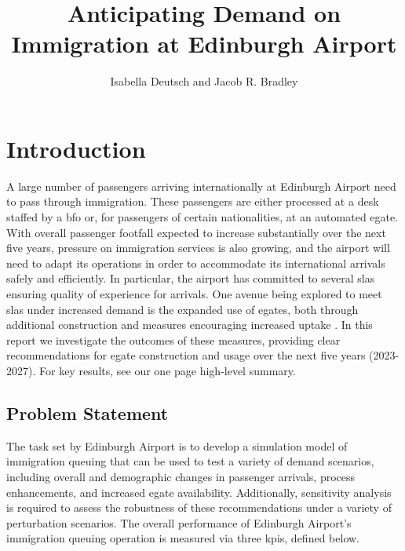 \documentclass[10pt]{article}
\title{Anticipating Demand on Immigration at Edinburgh Airport}
\author{Isabella Deutsch and Jacob R. Bradley}
\date{}
\begin{document}
\maketitle

\section{Introduction}

A large number of passengers arriving internationally at Edinburgh Airport need to pass through immigration. These passengers are either processed at a desk staffed by a \gls{bfo} or, for passengers of certain nationalities, at an automated \gls{egate}. With overall passenger footfall expected to increase substantially over the next five years, pressure on immigration services is also growing, and the airport will need to adapt its operations in order to accommodate its international arrivals safely and efficiently. In particular, the airport has committed to several \glspl{sla} ensuring quality of experience for arrivals.  One avenue being explored to meet \glspl{sla} under increased demand is the expanded use of \glspl{egate}, both through additional construction and measures encouraging increased uptake \cite{UK_border_2025}. In this report we investigate the outcomes of these measures, providing clear recommendations for \gls{egate} construction and usage over the next five years (2023-2027). For key results, see our one page high-level summary.

\subsection{Problem Statement}
The task set by Edinburgh Airport is to develop a simulation model of immigration queuing that can be used to test a variety of demand scenarios, including overall and demographic changes in passenger arrivals, process enhancements, and increased \gls{egate} availability. 
Additionally, sensitivity analysis is required to assess the robustness of these recommendations under a variety of perturbation scenarios.
The overall performance of Edinburgh Airport's immigration queuing operation is measured via three \glspl{kpi}, defined below.
\end{document}
